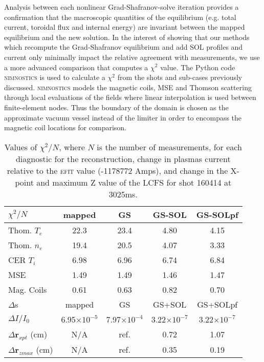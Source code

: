 \documentclass[english,aps,superscriptaddress,showkeys,showpacs,prepri,twocolumn]{revtex4}
\providecommand{\tabularnewline}{\\}
\begin{document}
Analysis between each nonlinear Grad-Shafranov-solve iteration 
provides a confirmation
that the macroscopic quantities of the equilibrium (e.g. total current,
toroidal flux and internal energy) are invariant between the mapped equilibrium
and the new solution.  In the interest of showing that our methods which recompute
the Grad-Shafranov equilibrium and add SOL profiles and current only minimally
impact the relative agreement with measurements, we use a more advanced
comparison that computes a $\chi^2$ value.  The Python code \textsc{nimnostics} is used
to calculate a $\chi^2$ from the shots and sub-cases previously
discussed. \textsc{nimnostics} models the magnetic coils, MSE and Thomson
scattering through local evaluations of the fields where linear
interpolation is used between finite-element nodes. Thus the boundary of the
domain is chosen as the approximate vacuum vessel instead of the limiter in order to
encompass the magnetic coil locations for comparison. 

\begin{table}
\caption{
Values of $\chi^2 /N$, where $N$ is the number of measurements, for each
diagnostic for the reconstruction, change in plasmas current relative to the
\textsc{efit} value (-1178772 Amps), and change in the X-point and maximum Z value of the
LCFS for shot 160414 at 3025ms.
\label{tab:chisq160414}}
\centering{}%
\begin{tabular}{lcccc}
\hline
$\chi^2 /N$ & mapped & GS & GS-SOL & GS-SOLpf \tabularnewline
\hline
Thom. $T_e$ & 22.3 & 23.4 & 4.80 & 4.15 \tabularnewline
Thom. $n_e$ & 19.4 & 20.5 & 4.07 & 3.33 \tabularnewline
CER $T_i$   & 6.98 & 6.96 & 6.74 & 6.84 \tabularnewline
MSE         & 1.49 & 1.49 & 1.46 & 1.47 \tabularnewline
Mag. Coils  & 0.61 & 0.63 & 0.82 & 0.70 \tabularnewline
\hline
$\Delta$s   & mapped & GS & GS+SOL & GS+SOLpf \tabularnewline
\hline
$\Delta I/I_0$ & 6.95$\times 10^{-5}$ & 7.97$\times 10^{-4}$ & 3.22$\times 10^{-7}$ & 3.22$\times 10^{-7}$ \tabularnewline
$\Delta \mathbf{r}_{xpt}$ (cm)  & N/A & ref. & 0.72 & 1.07 \tabularnewline
$\Delta \mathbf{r}_{zmax}$ (cm) & N/A & ref. & 0.35 & 0.19 \tabularnewline
\hline
\end{tabular}
\end{table}
\end{document}
